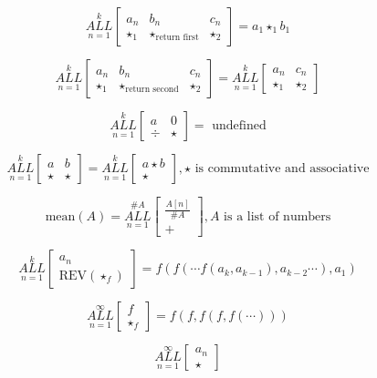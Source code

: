 \documentclass{article}
\begin{document}
$$\underset{n=1}{\overset{k}{ALL}} \begin{bmatrix}
a_n & b_n & c_n\\
\star_1 & \star_{\text{return first}} & \star_2
\end{bmatrix} = a_1 \star_1 b_1$$

$$\underset{n=1}{\overset{k}{ALL}} \begin{bmatrix}
a_n & b_n & c_n\\
\star_1 & \star_{\text{return second}} & \star_2
\end{bmatrix} = \underset{n=1}{\overset{k}{ALL}} \begin{bmatrix}
a_n & c_n\\
\star_1 & \star_2
\end{bmatrix}$$

$$\underset{n=1}{\overset{k}{ALL}} \begin{bmatrix}
a & 0\\
\div & \star
\end{bmatrix}=\text{ undefined}$$

$$\underset{n=1}{\overset{k}{ALL}} \begin{bmatrix}
a & b\\
\star & \star
\end{bmatrix}=\underset{n=1}{\overset{k}{ALL}} \begin{bmatrix}
a \star b\\
\star
\end{bmatrix}, \star \text{ is commutative and associative}$$

$$\text{mean}(A) = \underset{n=1}{\overset{\# A}{ALL}} \begin{bmatrix}
\frac{A[n]}{\# A}\\
+
\end{bmatrix}, A \text{ is a list of numbers}$$

$$\underset{n=1}{\overset{k}{ALL}} \begin{bmatrix}
a_n \\
\text{REV} (\star_f)
\end{bmatrix} = f( f( \cdots f(a_k, a_{k-1}), a_{k-2} \cdots ), a_1)$$

$$\underset{n=1}{\overset{\infty}{ALL}} \begin{bmatrix}
f \\
\star_f
\end{bmatrix}=f(f,f(f,f(\cdots)))$$

$$\underset{n=1}{\overset{\infty}{ALL}} \begin{bmatrix}
a_n \\
\star
\end{bmatrix}$$
\end{document}
